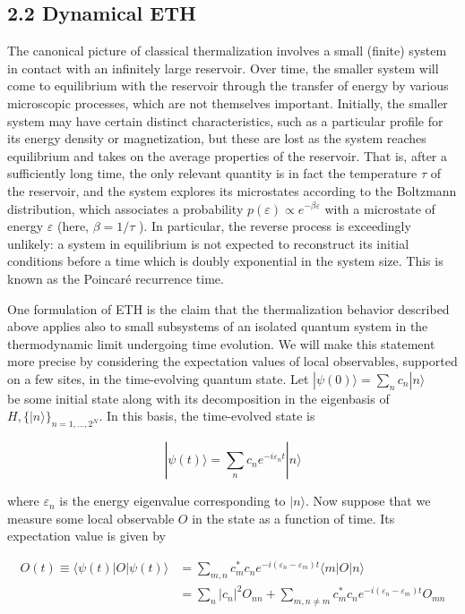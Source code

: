 \documentclass[12pt]{article}
\begin{document}
\subsection*{2.2 Dynamical ETH}
The canonical picture of classical thermalization involves a small (finite) system in contact with an infinitely large reservoir. Over time, the smaller system will come to equilibrium with the reservoir through the transfer of energy by various microscopic processes, which are not themselves important. Initially, the smaller system may have certain distinct characteristics, such as a particular profile for its energy density or magnetization, but these are lost as the system reaches equilibrium and takes on the average properties of the reservoir. That is, after a sufficiently long time, the only relevant quantity is in fact the temperature $\tau$ of the reservoir, and the system explores its microstates according to the Boltzmann distribution, which associates a probability $p(\varepsilon) \propto e^{-\beta \varepsilon}$ with a microstate of energy $\varepsilon$ (here, $\beta=1 / \tau$ ). In particular, the reverse process is exceedingly unlikely: a system in equilibrium is not expected to reconstruct its initial conditions before a time which is doubly exponential in the system size. This is known as the Poincaré recurrence time.

One formulation of ETH is the claim that the thermalization behavior described above applies also to small subsystems of an isolated quantum system in the thermodynamic limit undergoing time evolution. We will make this statement more precise by considering the expectation values of local observables, supported on a few sites, in the time-evolving quantum state. Let $|\psi(0)\rangle=\sum_{n} c_{n}|n\rangle$\\
be some initial state along with its decomposition in the eigenbasis of $H,\{|n\rangle\}_{n=1, \ldots, 2^{N}}$. In this basis, the time-evolved state is


\begin{equation*}
|\psi(t)\rangle=\sum_{n} c_{n} e^{-i \varepsilon_{n} t}|n\rangle \tag{2}
\end{equation*}


where $\varepsilon_{n}$ is the energy eigenvalue corresponding to $|n\rangle$. Now suppose that we measure some local observable $O$ in the state as a function of time. Its expectation value is given by


\begin{align*}
O(t) \equiv\langle\psi(t)|O| \psi(t)\rangle & =\sum_{m, n} c_{m}^{*} c_{n} e^{-i\left(\varepsilon_{n}-\varepsilon_{m}\right) t}\langle m|O| n\rangle  \tag{3}\\
& =\sum_{n}\left|c_{n}\right|^{2} O_{n n}+\sum_{m, n \neq m} c_{m}^{*} c_{n} e^{-i\left(\varepsilon_{n}-\varepsilon_{m}\right) t} O_{m n} \tag{4}
\end{align*}
\end{document}
